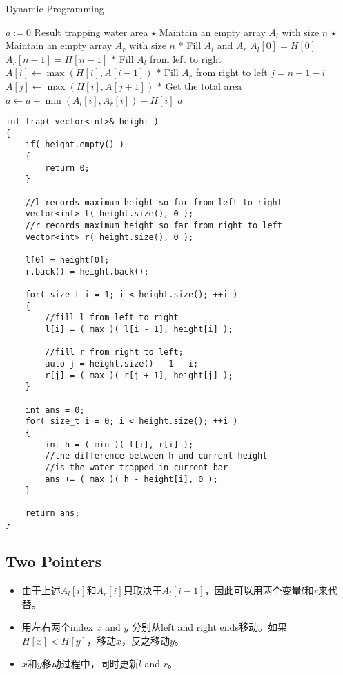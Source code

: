 \begin{algorithm}[H]
\caption{Dynamic Programming}
\begin{algorithmic}[1]
\State $a:= 0$ \Comment Result trapping water area
\State $\star$ Maintain an empty array $A_l$ with size $n$
\State $\star$ Maintain an empty array $A_r$ with size $n$
\State $\ast$ Fill $A_l$ and $A_r$
\State $A_l[0] = H[0]$
\State $A_r[n-1] = H[n-1]$
\State $\ast$ Fill $A_l$ from left to right
\State $A[i]\gets \max(H[i], A[i-1])$
\State $\ast$ Fill $A_r$ from right to left
\State $j = n - 1 -i$
\State $A[j]\gets \max(H[i], A[j+1])$
\EndFor
\State $\ast$ Get the total area
\State $a\gets a + \min(A_l[i], A_r[i]) - H[i]$
\EndFor
\State \Return $a$
\EndProcedure
\end{algorithmic}
\end{algorithm}

\setcounter{lstlisting}{0}
\begin{lstlisting}[style=customc, caption={Dynamic Programming}]
int trap( vector<int>& height )
{
    if( height.empty() )
    {
        return 0;
    }

    //l records maximum height so far from left to right
    vector<int> l( height.size(), 0 );
    //r records maximum height so far from right to left
    vector<int> r( height.size(), 0 );

    l[0] = height[0];
    r.back() = height.back();

    for( size_t i = 1; i < height.size(); ++i )
    {
        //fill l from left to right
        l[i] = ( max )( l[i - 1], height[i] );

        //fill r from right to left;
        auto j = height.size() - 1 - i;
        r[j] = ( max )( r[j + 1], height[j] );
    }

    int ans = 0;
    for( size_t i = 0; i < height.size(); ++i )
    {
        int h = ( min )( l[i], r[i] );
        //the difference between h and current height
        //is the water trapped in current bar
        ans += ( max )( h - height[i], 0 );
    }

    return ans;
}
\end{lstlisting}

\subsection{Two Pointers}
\begin{itemize}
\item 由于上述$A_l[i]$和$A_r[i]$只取决于$A_l[i-1]$，因此可以用两个变量$l$和$r$来代替。
\item 用左右两个index $x$ and $y$ 分别从left and right ends移动。如果 $H[x] < H[y]$，移动$x$，反之移动$y$。
\item $x$和$y$移动过程中，同时更新$l$ and $r$。
\end{itemize}


